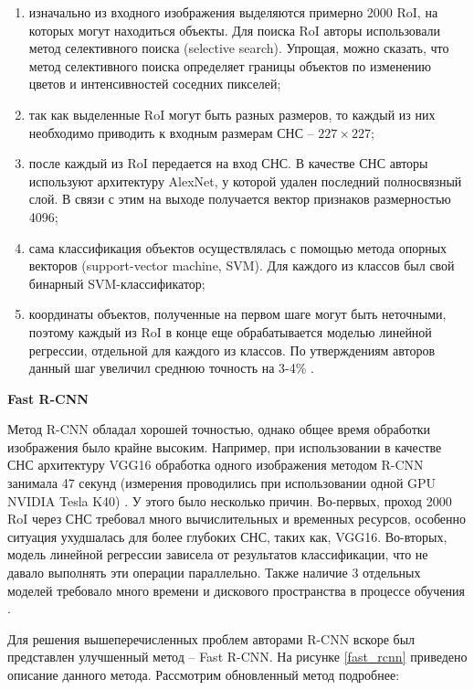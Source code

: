 
\begin{enumerate}
\item изначально из входного изображения выделяются примерно 2000 RoI, на которых могут находиться объекты. Для 
поиска RoI авторы использовали метод селективного поиска (selective search). Упрощая, можно сказать, что метод 
селективного поиска определяет границы объектов по изменению цветов и интенсивностей соседних пикселей;
\item так как выделенные RoI могут быть разных размеров, то каждый из них необходимо приводить к входным размерам 
СНС -- $227 \times 227$;
\item после каждый из RoI передается на вход СНС. В качестве СНС авторы используют архитектуру AlexNet, у которой 
удален последний полносвязный слой. В связи с этим на выходе получается вектор признаков размерностью 4096;
\item сама классификация объектов осуществлялась с помощью метода опорных векторов (support-vector machine, SVM). Для 
каждого из классов был свой бинарный SVM-классификатор;
\item координаты объектов, полученные на первом шаге могут быть неточными, поэтому каждый из RoI в конце еще обрабатывается 
моделью линейной регрессии, отдельной для каждого из классов. По утверждениям авторов данный шаг увеличил среднюю точность
на 3-4\% \cite{RCNN}.
\end{enumerate}

\textbf{Fast R-CNN}

Метод R-CNN обладал хорошей точностью, однако общее время обработки изображения было крайне высоким. Например, при использовании
в качестве СНС архитектуру VGG16 обработка одного изображения методом R-CNN занимала 47 секунд (измерения проводились при 
использовании одной GPU NVIDIA Tesla K40) \cite{FAST_RCNN}. У этого было несколько причин. Во-первых, проход 2000 RoI через
СНС требовал много вычислительных и временных ресурсов, особенно ситуация ухудшалась для более глубоких СНС, таких как, VGG16.
Во-вторых, модель линейной регрессии зависела от результатов классификации, что не давало выполнять эти операции параллельно.
Также наличие 3 отдельных моделей требовало много времени и дискового пространства в процессе обучения \cite{FAST_RCNN}.

Для решения вышеперечисленных проблем авторами R-CNN вскоре был представлен улучшенный метод -- Fast R-CNN. На рисунке \ref{fast_rcnn}
приведено описание данного метода. Рассмотрим обновленный метод подробнее:


